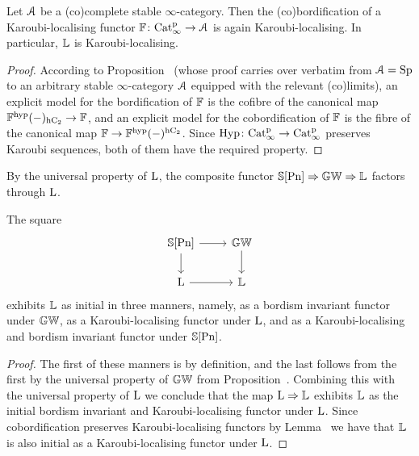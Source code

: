\begin{lemma}
\label{lemma:bordification-again-KL}%
Let $\mathcal{A}$ be a (co)complete stable $\infty$-category. Then the (co)bordification %
of a Karoubi-localising functor $\mathbb{F}\colon \mathrm{Cat}^{\mathrm p}_\infty \to \mathcal{A}$ is again Karoubi-localising. In particular, $\mathbb{L}$ is Karoubi-localising. %
\end{lemma}
\begin{proof}
According to Proposition~ (whose proof carries over verbatim from $\mathcal{A}=\mathrm{Sp}$ to an arbitrary stable $\infty$-category $\mathcal{A}$ equipped with the relevant (co)limits), an explicit model for the bordification of $\mathbb{F}$ is the cofibre of the canonical map $\mathbb{F}^{\mathrm{hyp}}(-)_{\mathrm{h}\mathrm{C_2}}\to \mathbb{F}$, and an explicit model for the cobordification of $\mathbb{F}$ is the fibre of the canonical map $\mathbb{F}\to \mathbb{F}^{\mathrm{hyp}}(-)^{\mathrm{h}\mathrm{C_2}}$. Since $\operatorname{Hyp}\colon \mathrm{Cat}^{\mathrm p}_\infty\to \mathrm{Cat}^{\mathrm p}_\infty$ preserves Karoubi sequences, both of them have the required property. %
\end{proof}

By the universal property of $\operatorname L$, the composite functor $\mathbb{S}[\mathrm{Pn}] \Rightarrow \mathbb{GW} \Rightarrow \mathbb{L}$ factors through $\operatorname L$.
\begin{proposition}
\label{proposition:universal-KL}%
The square
\[
\begin{tikzcd}
\SS[\Poinc]\ar[r]\ar[d] & \KGW \ar[d] \\
\L \ar[r] & \KL
\end{tikzcd}
\]
exhibits $\mathbb{L}$ as initial in three manners, namely, as a bordism invariant functor under $\mathbb{GW}$, as a Karoubi-localising functor under $\operatorname L$, and as a Karoubi-localising and bordism invariant functor under $\mathbb{S}[\mathrm{Pn}]$.
\end{proposition}

\begin{proof}
The first of these manners is by definition, and the last follows from the first by
the universal property of $\mathbb{GW}$ from Proposition~. %
Combining this with the universal property of $\operatorname L$ we conclude that the map $\operatorname L \Rightarrow \mathbb{L}$ exhibits $\mathbb{L}$ as the initial bordism invariant and Karoubi-localising functor under $\operatorname L$. Since cobordification preserves Karoubi-localising functors by Lemma~ we have that $\mathbb{L}$ is also initial as a Karoubi-localising functor under $\operatorname L$.
\end{proof}




















